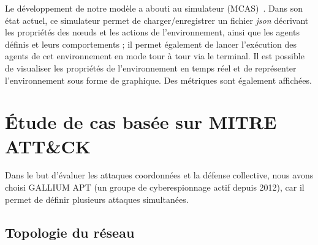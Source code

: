 Le développement de notre modèle a abouti au simulateur  (MCAS)~\cite{MCASWebsite}. Dans son état actuel, ce simulateur permet de charger/enregistrer un fichier \textit{json} décrivant les propriétés des nœuds et les actions de l'environnement, ainsi que les agents définis et leurs comportements ; il permet également de lancer l'exécution des agents de cet environnement en mode tour à tour via le terminal. Il est possible de visualiser les propriétés de l'environnement en temps réel et de représenter l'environnement sous forme de graphique. Des métriques sont également affichées.



\section{Étude de cas basée sur MITRE ATT\&CK}


\noindent
Dans le but d'évaluer les attaques coordonnées et la défense collective, nous avons choisi GALLIUM APT (un groupe de cyberespionnage actif depuis 2012), car il permet de définir plusieurs attaques simultanées.


\subsection{Topologie du réseau}


